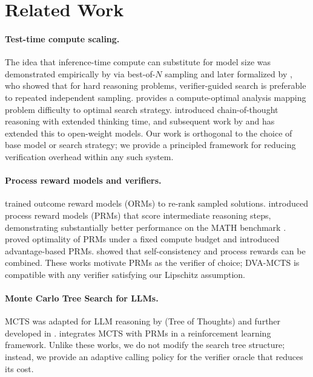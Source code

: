 \section{Related Work}
\label{sec:related}

\paragraph{Test-time compute scaling.}
The idea that inference-time compute can substitute for model size was demonstrated
empirically by \citet{brown2024large} via best-of-$N$ sampling and later formalized
by \citet{snell2024scaling}, who showed that for hard reasoning problems, verifier-guided
search is preferable to repeated independent sampling. \citet{wu2024inference} provides a
compute-optimal analysis mapping problem difficulty to optimal search strategy.
\citet{openai2024o1} introduced chain-of-thought reasoning with extended thinking time,
and subsequent work by \citet{guo2025deepseek} and \citet{qwq2024} has extended this
to open-weight models. Our work is orthogonal to the choice of base model or search
strategy; we provide a principled framework for reducing verification overhead within
any such system.

\paragraph{Process reward models and verifiers.}
\citet{cobbe2021training} trained outcome reward models (ORMs) to re-rank sampled
solutions. \citet{lightman2023lets} introduced process reward models (PRMs) that score
intermediate reasoning steps, demonstrating substantially better performance on the
MATH benchmark \citep{hendrycks2021math}. \citet{setlur2024rewarding} proved
optimality of PRMs under a fixed compute budget and introduced advantage-based PRMs.
\citet{wang2024math} showed that self-consistency and process rewards can be combined.
These works motivate PRMs as the verifier of choice; DVA-MCTS is compatible with any
verifier satisfying our Lipschitz assumption.

\paragraph{Monte Carlo Tree Search for LLMs.}
MCTS was adapted for LLM reasoning by \citet{yao2023tree} (Tree of Thoughts) and
further developed in \citet{chen2024alphamath,zhang2024llamaberry,hao2023reasoning}.
\citet{guo2025deepseek} integrates MCTS with PRMs in a reinforcement learning
framework. Unlike these works, we do not modify the search tree structure; instead,
we provide an adaptive calling policy for the verifier oracle that reduces its cost.

